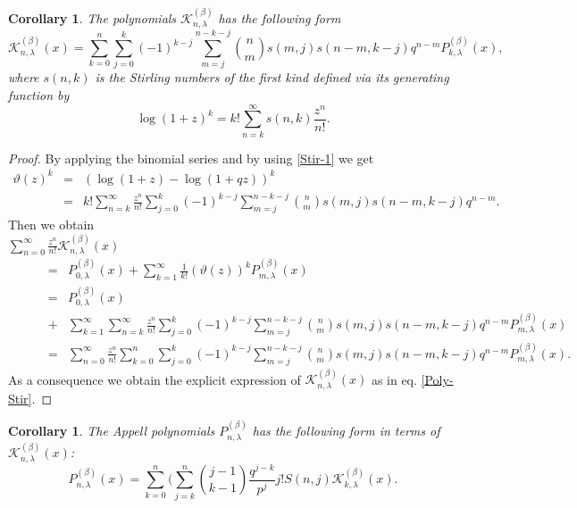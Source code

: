 \documentclass{birkjour}
\newtheorem{cor}[thm]{Corollary}
\theoremstyle{definition}
\theoremstyle{remark}
\numberwithin{equation}{section}
\begin{document}
\begin{cor}
The polynomials $\mathcal{K}^{(\beta)}_{n, \lambda}$ has the
following form
\begin{equation}\label{Poly-Stir}
\mathcal{K}^{(\beta)}_{n,
\lambda}(x)=\displaystyle{\sum^{n}_{k=0}\sum^{k}_{j=0}(-1)^{k-j}\sum^{n-k-j}_{m=j}\binom{n}{m}s(m,
j)s(n-m, k-j)q^{n-m}P^{(\beta)}_{k, \lambda}(x)},
\end{equation}
where $s(n, k)$ is the Stirling numbers of the first kind defined
via its generating function by
\begin{equation}\label{Stir-1}
\displaystyle{\log(1+z)^{k}=k!\sum^{\infty}_{n=k}s(n,
k)\frac{z^{n}}{n!}}.
\end{equation}
\end{cor}
\begin{proof}
By applying the binomial series and by using \eqref{Stir-1} we get
$$\begin{array}{lll}
\vartheta(z)^{k}&=&(\log(1+z)-\log(1+qz))^{k}\\
&=&\displaystyle{k!\sum^{\infty}_{n=k}\frac{z^{n}}{n!}\sum^{k}_{j=0}(-1)^{k-j}\sum^{n-k-j}_{m=j}\binom{n}{m}s(m,
j)s(n-m, k-j)q^{n-m}}.
\end{array}$$
Then we obtain\\

$\displaystyle{\sum^{\infty}_{n=0}\frac{z^{n}}{n!}\mathcal{K}^{(\beta)}_{n,
\lambda}(x)}$
$$\begin{array}{lll}
\qquad&=&P^{(\beta)}_{0,
\lambda}(x)+\displaystyle{\sum^{\infty}_{k=1}\frac{1}{k!}(\vartheta(z))^{k}P^{(\beta)}_{m, \lambda}(x)}\\
&=&P^{(\beta)}_{0,
\lambda}(x)\\
&+&\displaystyle{\sum^{\infty}_{k=1}\sum^{\infty}_{n=k}\frac{z^{n}}{n!}
\sum^{k}_{j=0}(-1)^{k-j}\sum^{n-k-j}_{m=j}\binom{n}{m}s(m, j)s(n-m,
k-j)q^{n-m}P^{(\beta)}_{m, \lambda}(x)}\\
&=&\displaystyle{\sum^{\infty}_{n=0}\frac{z^{n}}{n!}\sum^{n}_{k=0}
\sum^{k}_{j=0}(-1)^{k-j}\sum^{n-k-j}_{m=j}\binom{n}{m}s(m, j)s(n-m,
k-j)q^{n-m}P^{(\beta)}_{m, \lambda}(x)}.
\end{array}$$
As a consequence we obtain the explicit expression of
$\mathcal{K}^{(\beta)}_{n, \lambda}(x)$ as in eq. \eqref{Poly-Stir}.
\end{proof}
\begin{cor}
The Appell polynomials $P^{(\beta)}_{n, \lambda}$ has the following
form in terms of $\mathcal{K}^{(\beta)}_{n, \lambda}(x)$:
\begin{equation}\label{Poly-Stir-2}
P^{(\beta)}_{n,
\lambda}(x)=\displaystyle{\sum^{n}_{k=0}\Big(\sum^{n}_{j=k}\binom{j-1}{k-1}\frac{q^{j-k}}{p^{j}}
j!S(n, j)\mathcal{K}^{(\beta)}_{k, \lambda}(x)}.
\end{equation}
\end{cor}
\end{document}
